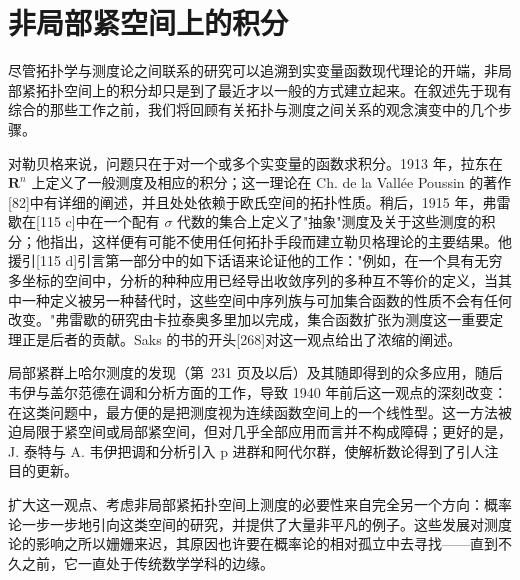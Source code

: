 \chapter{非局部紧空间上的积分}

尽管拓扑学与测度论之间联系的研究可以追溯到实变量函数现代理论的开端，非局部紧拓扑空间上的积分却只是到了最近才以一般的方式建立起来。在叙述先于现有综合的那些工作之前，我们将回顾有关拓扑与测度之间关系的观念演变中的几个步骤。

对勒贝格来说，问题只在于对一个或多个实变量的函数求积分。1913 年，拉东在 \(\mathbf{R}^n\) 上定义了一般测度及相应的积分；这一理论在 Ch. de la Vallée Poussin 的著作{[}82{]}中有详细的阐述，并且处处依赖于欧氏空间的拓扑性质。稍后，1915 年，弗雷歇在{[}115 c{]}中在一个配有 \(\sigma\) 代数的集合上定义了"抽象"测度及关于这些测度的积分；他指出，这样便有可能不使用任何拓扑手段而建立勒贝格理论的主要结果。他援引{[}115 d{]}引言第一部分中的如下话语来论证他的工作："例如，在一个具有无穷多坐标的空间中，分析的种种应用已经导出收敛序列的多种互不等价的定义，当其中一种定义被另一种替代时，这些空间中序列族与可加集合函数的性质不会有任何改变。"弗雷歇的研究由卡拉泰奥多里加以完成，集合函数扩张为测度这一重要定理正是后者的贡献。Saks 的书的开头{[}268{]}对这一观点给出了浓缩的阐述。

局部紧群上哈尔测度的发现（第~231 页及以后）及其随即得到的众多应用，随后韦伊与盖尔范德在调和分析方面的工作，导致 1940 年前后这一观点的深刻改变：在这类问题中，最方便的是把测度视为连续函数空间上的一个线性型。这一方法被迫局限于紧空间或局部紧空间，但对几乎全部应用而言并不构成障碍；更好的是，J. 泰特与 A. 韦伊把调和分析引入 p 进群和阿代尔群，使解析数论得到了引人注目的更新。

扩大这一观点、考虑非局部紧拓扑空间上测度的必要性来自完全另一个方向：概率论一步一步地引向这类空间的研究，并提供了大量非平凡的例子。这些发展对测度论的影响之所以姗姗来迟，其原因也许要在概率论的相对孤立中去寻找——直到不久之前，它一直处于传统数学学科的边缘。

